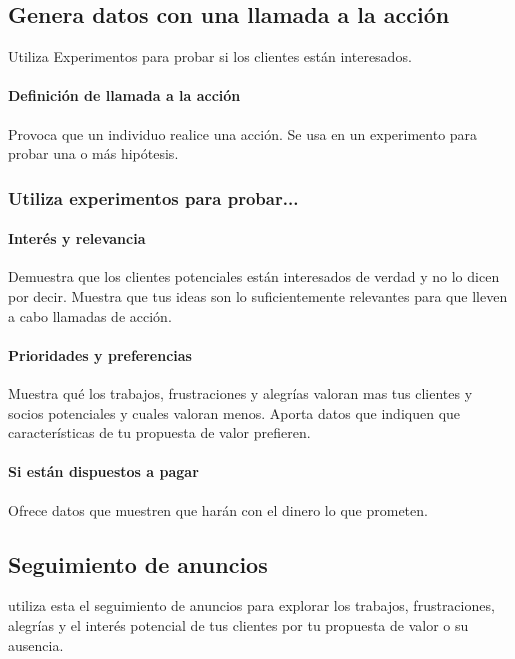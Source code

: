 \documentclass[11pt]{book}
\begin{document}
\subsection{Genera datos con una llamada a la acción}
Utiliza Experimentos para probar si los clientes están interesados.
\paragraph{Definición de llamada a la acción}
Provoca que un individuo realice una acción. Se usa en un experimento para probar una o más hipótesis.
\subsubsection{Utiliza experimentos para probar...}
\paragraph{Interés y relevancia}
Demuestra que los clientes potenciales están interesados de verdad y no lo dicen por decir. Muestra que tus ideas son lo suficientemente relevantes para que lleven a cabo llamadas de acción.
\paragraph{Prioridades y preferencias}
Muestra qué los trabajos, frustraciones y alegrías valoran mas tus clientes y socios potenciales y cuales valoran menos. Aporta datos que indiquen que características de tu propuesta de valor prefieren.
\paragraph{Si están dispuestos a pagar}
Ofrece datos que muestren que harán con el dinero lo que prometen.
\subsection{Seguimiento de anuncios}
utiliza esta el seguimiento de anuncios para explorar los trabajos, frustraciones, alegrías y el interés potencial de tus clientes por tu propuesta de valor o su ausencia. 
\end{document}
